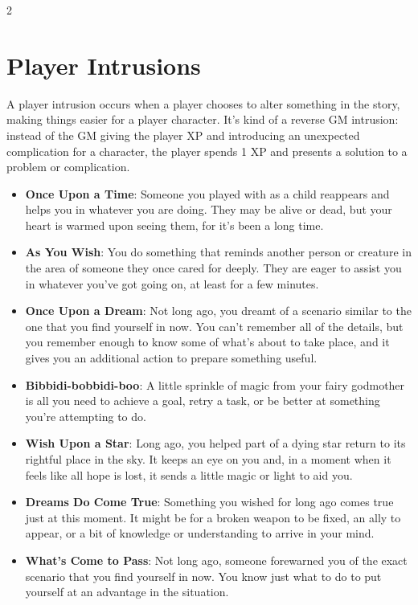 \begin{multicols}{2}

\section{Player Intrusions}

A player intrusion occurs when a player chooses to alter something in the story, making things easier for a player character. It’s kind of a reverse GM intrusion: instead of the GM giving the player XP and introducing an unexpected complication for a character, the player spends 1 XP
and presents a solution to a problem or complication.

\begin{itemize}
\item \textbf{Once Upon a Time}: Someone you played with as a child reappears and helps you in whatever you are doing. They may be alive or dead, but your heart is warmed upon seeing them, for it’s been a long time.
\item \textbf{As You Wish}: You do something that reminds another person or creature in the area of someone they once cared for deeply. They are eager to assist you in whatever you’ve got going on, at least for a few minutes.
\item \textbf{Once Upon a Dream}: Not long ago, you dreamt of a scenario similar to the one that you find yourself in now. You can’t remember all of the details, but you remember enough to know some of what’s about to take place, and it gives you an additional action to prepare something useful.
\item \textbf{Bibbidi-bobbidi-boo}: A little sprinkle of magic from your fairy godmother is all you need to achieve a goal, retry a task, or be better at something you’re attempting to do.
\item \textbf{Wish Upon a Star}: Long ago, you helped part of a dying star return to its rightful place in the sky. It keeps an eye on you and, in a moment when it feels like all hope is lost, it sends a little magic or light to aid you.
\item \textbf{Dreams Do Come True}: Something you wished for long ago comes true just at this moment. It might be for a broken weapon to be fixed, an ally to appear, or a bit of knowledge or understanding to arrive in your mind.
\item \textbf{What’s Come to Pass}: Not long ago, someone forewarned you of the exact scenario that you find yourself in now. You know just what to do to put yourself at an advantage in the situation.

\end{itemize}
\end{multicols}
